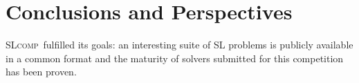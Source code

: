 \documentclass[twoside,11pt]{article}
\newcommand{\slcomp}{\textsc{SLcomp}}
\begin{document}
%
%



\section{Conclusions and Perspectives}

\slcomp\ fulfilled its goals:
an interesting suite of SL problems is publicly available in a common format and
the maturity of solvers submitted for this competition has been proven.
\end{document}
